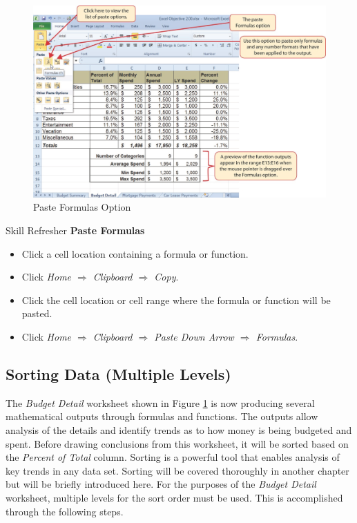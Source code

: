 \begin{figure}[H]
	\centering
	\includegraphics[width=\maxwidth{.95\linewidth}]{gfx/ch02_fig26}
	\caption{Paste Formulas Option}
	\label{02:fig26}
\end{figure}

\begin{center}
	\begin{sklbox}{Skill Refresher}
		\textbf{Paste Formulas}
		\\
		\begin{itemize}
			\setlength{\itemsep}{0pt}
			\setlength{\parskip}{0pt}
			\setlength{\parsep}{0pt}
			
			\item Click a cell location containing a formula or function.
			\item Click \textit{Home $ \Rightarrow $ Clipboard $ \Rightarrow $ Copy}.
			\item Click the cell location or cell range where the formula or function will be pasted.
			\item Click \textit{Home $ \Rightarrow $ Clipboard $ \Rightarrow $ Paste Down Arrow $ \Rightarrow $ Formulas}.
			
		\end{itemize}
	\end{sklbox}
\end{center}

\subsection{Sorting Data (Multiple Levels)}

The \textit{Budget Detail} worksheet shown in Figure \ref{02:fig26} is now producing several mathematical outputs through formulas and functions. The outputs allow analysis of the details and identify trends as to how money is being budgeted and spent. Before drawing conclusions from this worksheet, it will be sorted based on the \textit{Percent of Total} column. Sorting is a powerful tool that enables analysis of key trends in any data set. Sorting will be covered thoroughly in another chapter but will be briefly introduced here. For the purposes of the \textit{Budget Detail} worksheet, multiple levels for the sort order must be used. This is accomplished through the following steps.

